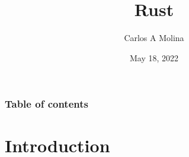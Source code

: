 \documentclass{beamer}
\title[Rust]{Rust} %
\author{Carlos A Molina}
\date{May 18, 2022}
\begin{document}
\begin{frame}
\titlepage %
\end{frame}

\begin{frame}
\frametitle{Table of contents}
\tableofcontents %
\end{frame}


\section{Introduction} %
\end{document}
